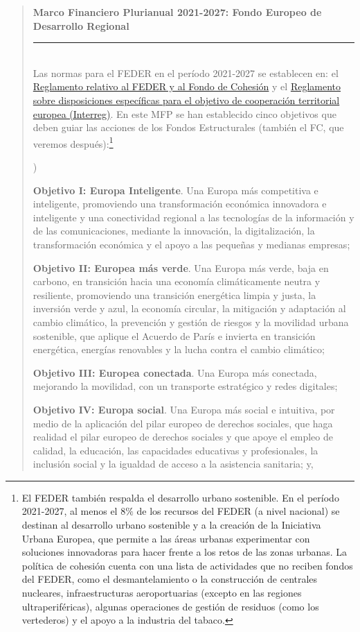 \documentclass[10pt,a4paper]{article}
\newcounter{alphaitem}
\newenvironment{la}
      {\begin{list}{\alph{alphaitem})}{%
          \usecounter{alphaitem}%
          \setlength{\leftmargin}{1cm}%
          \setlength{\parskip}{3pt}%
          \setlength{\itemsep}{0pt}%
          \setlength{\parsep}{0pt}%
      }}
      {\end{list}}
\newenvironment{specialblock}[1]{%
      \begin{quote} %
      \small %
      \noindent\textbf{#1}\\[-0.3em] %
      \rule{\linewidth}{0.4pt}\\[0.6em]}{
      \end{quote}}
\begin{document}
\begin{specialblock}{Marco Financiero Plurianual 2021-2027: Fondo Europeo de Desarrollo Regional}
    Las normas para el FEDER en el período 2021-2027 se establecen en: el \href{https://www.boe.es/buscar/doc.php?id=DOUE-L-2021-80891}{Reglamento relativo al FEDER y al Fondo de Cohesión} y el \href{https://www.boe.es/buscar/doc.php?id=DOUE-L-2021-80892}{Reglamento sobre disposiciones específicas para el objetivo de cooperación territorial europea (Interreg)}. En este MFP se han establecido cinco objetivos que deben guiar las acciones de los Fondos Estructurales (también el FC, que veremos después):\footnote{%
        El FEDER también respalda el desarrollo urbano sostenible. En el período 2021-2027, al menos el $8\%$ de los recursos del FEDER (a nivel nacional) se destinan al desarrollo urbano sostenible y a la creación de la Iniciativa Urbana Europea, que permite a las áreas urbanas experimentar con soluciones innovadoras para hacer frente a los retos de las zonas urbanas. La política de cohesión cuenta con una lista de actividades que no reciben fondos del FEDER, como el desmantelamiento o la construcción de centrales nucleares, infraestructuras aeroportuarias (excepto en las regiones ultraperiféricas), algunas operaciones de gestión de residuos (como los vertederos) y el apoyo a la industria del tabaco.
    }
    \begin{la}
        \item \textbf{Objetivo I: Europa Inteligente}. Una Europa más competitiva e inteligente, promoviendo una transformación económica innovadora e inteligente y una conectividad regional a las tecnologías de la información y de las comunicaciones, mediante la innovación, la digitalización, la transformación económica y el apoyo a las pequeñas y medianas empresas;
        \item \textbf{Objetivo II: Europea más verde}. Una Europa más verde, baja en carbono, en transición hacia una economía climáticamente neutra y resiliente, promoviendo una transición energética limpia y justa, la inversión verde y azul, la economía circular, la mitigación y adaptación al cambio climático, la prevención y gestión de riesgos y la movilidad urbana sostenible, que aplique el Acuerdo de París e invierta en transición energética, energías renovables y la lucha contra el cambio climático;
        \item \textbf{Objetivo III: Europea conectada}. Una Europa más conectada, mejorando la movilidad, con un transporte estratégico y redes digitales;
        \item \textbf{Objetivo IV: Europa social}. Una Europa más social e intuitiva, por medio de la aplicación del pilar europeo de derechos sociales, que haga realidad el pilar europeo de derechos sociales y que apoye el empleo de calidad, la educación, las capacidades educativas y profesionales, la inclusión social y la igualdad de acceso a la asistencia sanitaria; y,

\end{la}
\end{specialblock}
\end{document}

